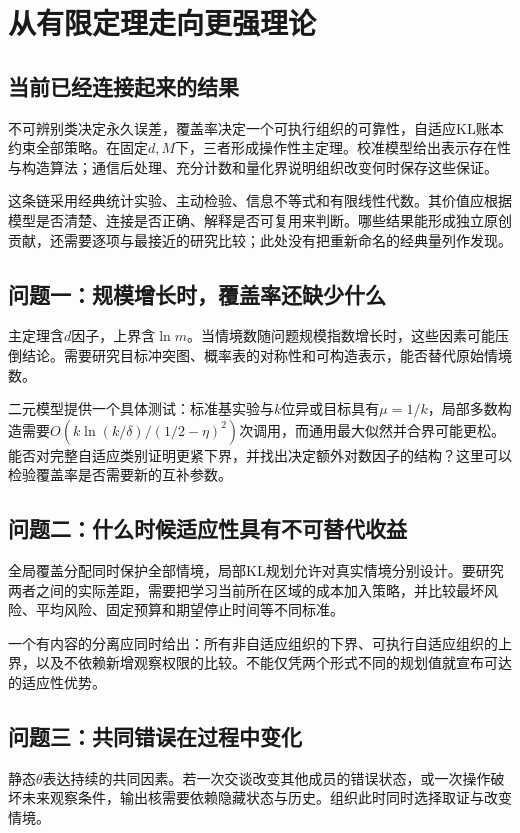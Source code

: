 \chapter{从有限定理走向更强理论}
\label{ch:frontiers}

\section{当前已经连接起来的结果}
不可辨别类决定永久误差，覆盖率决定一个可执行组织的可靠性，自适应KL账本约束全部策略。在固定$d,M$下，三者形成操作性主定理。校准模型给出表示存在性与构造算法；通信后处理、充分计数和量化界说明组织改变何时保存这些保证。

这条链采用经典统计实验、主动检验、信息不等式和有限线性代数。其价值应根据模型是否清楚、连接是否正确、解释是否可复用来判断。哪些结果能形成独立原创贡献，还需要逐项与最接近的研究比较；此处没有把重新命名的经典量列作发现。

\section{问题一：规模增长时，覆盖率还缺少什么}
主定理含$d$因子，上界含$\ln m$。当情境数随问题规模指数增长时，这些因素可能压倒结论。需要研究目标冲突图、概率表的对称性和可构造表示，能否替代原始情境数。

二元模型提供一个具体测试：标准基实验与$k$位异或目标具有$\mu=1/k$，局部多数构造需要$O(k\ln(k/\delta)/(1/2-\eta)^2)$次调用，而通用最大似然并合界可能更松。能否对完整自适应类别证明更紧下界，并找出决定额外对数因子的结构？这里可以检验覆盖率是否需要新的互补参数。

\section{问题二：什么时候适应性具有不可替代收益}
全局覆盖分配同时保护全部情境，局部KL规划允许对真实情境分别设计。要研究两者之间的实际差距，需要把学习当前所在区域的成本加入策略，并比较最坏风险、平均风险、固定预算和期望停止时间等不同标准。

一个有内容的分离应同时给出：所有非自适应组织的下界、可执行自适应组织的上界，以及不依赖新增观察权限的比较。不能仅凭两个形式不同的规划值就宣布可达的适应性优势。

\section{问题三：共同错误在过程中变化}
静态$\theta$表达持续的共同因素。若一次交谈改变其他成员的错误状态，或一次操作破坏未来观察条件，输出核需要依赖隐藏状态与历史。组织此时同时选择取证与改变情境。

